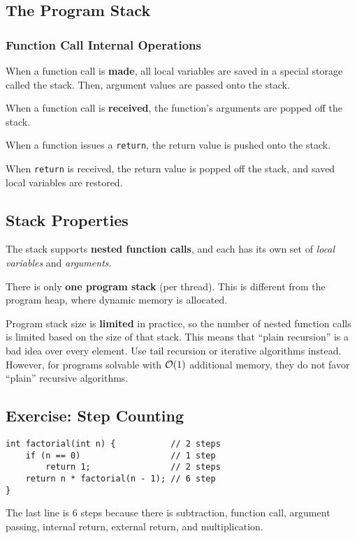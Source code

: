 \subsection{The Program Stack}
\subsubsection{Function Call Internal Operations}
When a function call is \textbf{made}, all local variables are saved in a special storage called the stack. Then, argument values are passed onto the stack.

When a function call is \textbf{received}, the function's arguments are popped off the stack.

When a function issues a \lstinline[style=C++]{return}, the return value is pushed onto the stack.

When \lstinline[style=C++]{return} is received, the return value is popped off the stack, and saved local variables are restored.

\subsection{Stack Properties}
The stack supports \textbf{nested function calls}, and each has its own set of \textit{local variables} and \textit{arguments}.

There is only \textbf{one program stack} (per thread). This is different from the program heap, where dynamic memory is allocated.

Program stack size is \textbf{limited} in practice, so the number of nested function calls is limited based on the size of that stack. This means that ``plain recursion'' is a bad idea over every element. Use tail recursion or iterative algorithms instead. However, for programs solvable with $\mathcal{O}(1)$ additional memory, they do not favor ``plain'' recursive algorithms.

\subsection{Exercise: Step Counting}
\begin{lstlisting}[style=C++]
int factorial(int n) {           // 2 steps
    if (n == 0)                  // 1 step
        return 1;                // 2 steps
    return n * factorial(n - 1); // 6 step
}	
\end{lstlisting}
The last line is 6 steps because there is subtraction, function call, argument passing, internal return, external return, and multiplication.

